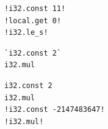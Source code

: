 {\begin{code}
\begin{minipage}[b]{0.31\linewidth}
\begin{minipage}[t]{.46\linewidth}
            \begin{lstlisting}
!i32.const 11!
!local.get 0!
!i32.le_s!
            \end{lstlisting}
        \end{minipage}%
        
        
    \end{minipage}\hfill\noindent
    \noindent\begin{minipage}[b]{0.32\linewidth}
        \label{overflow:example}
        \noindent\begin{minipage}[t]{0.46\linewidth}
            \begin{lstlisting}
`i32.const 2`
i32.mul
\end{lstlisting}
        \end{minipage}%
        \hfill\noindent\begin{minipage}[t]{0.46\linewidth}
            
            \begin{lstlisting}
i32.const 2
i32.mul
!i32.const -2147483647!
!i32.mul!
            \end{lstlisting}
        \end{minipage}
    \end{minipage}
    \end{code}
}

% 



% 



